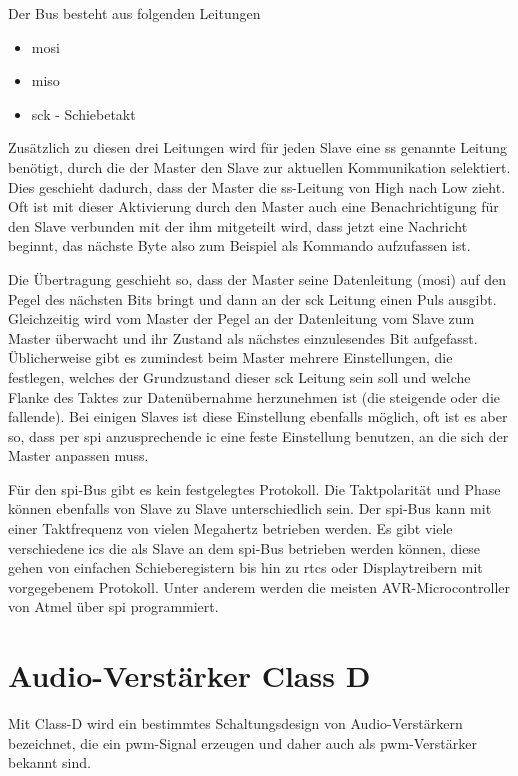 Der Bus besteht aus folgenden Leitungen
\begin{itemize}
	\item \ac{mosi}
	\item \ac{miso}
	\item \ac{sck} - Schiebetakt	
\end{itemize}
\cite{mikrocontroller-spi}

Zusätzlich zu diesen drei Leitungen wird für jeden Slave eine \ac{ss} genannte Leitung benötigt, durch die der Master den Slave zur aktuellen Kommunikation selektiert. Dies geschieht dadurch, dass der Master die \ac{ss}-Leitung von High nach Low zieht. Oft ist mit dieser Aktivierung durch den Master auch eine Benachrichtigung für den Slave verbunden mit der ihm mitgeteilt wird, dass jetzt eine Nachricht beginnt, das nächste Byte also zum Beispiel als Kommando aufzufassen ist. \cite{mikrocontroller-spi}\par

Die Übertragung geschieht so, dass der Master seine Datenleitung (\ac{mosi}) auf den Pegel des nächsten Bits bringt und dann an der \ac{sck} Leitung einen Puls ausgibt. Gleichzeitig wird vom Master der Pegel an der Datenleitung vom Slave zum Master überwacht und ihr Zustand als nächstes einzulesendes Bit aufgefasst. Üblicherweise gibt es zumindest beim Master mehrere Einstellungen, die festlegen, welches der Grundzustand dieser \ac{sck} Leitung sein soll und welche Flanke des Taktes zur Datenübernahme herzunehmen ist (die steigende oder die fallende). Bei einigen Slaves ist diese Einstellung ebenfalls möglich, oft ist es aber so, dass per \ac{spi} anzusprechende \ac{ic} eine feste Einstellung benutzen, an die sich der Master anpassen muss. \cite{mikrocontroller-spi}\par

Für den \ac{spi}-Bus gibt es kein festgelegtes Protokoll. Die Taktpolarität und Phase können ebenfalls von Slave zu Slave unterschiedlich sein. Der \ac{spi}-Bus kann mit einer Taktfrequenz von vielen Megahertz betrieben werden. Es gibt viele verschiedene \acp{ic} die als Slave an dem \ac{spi}-Bus betrieben werden können, diese gehen von einfachen Schieberegistern bis hin zu \acp{rtc} oder Displaytreibern mit vorgegebenem Protokoll. Unter anderem werden die meisten AVR-Microcontroller von Atmel über \ac{spi} programmiert. \cite{mikrocontroller-spi}\par

\section{Audio-Verstärker Class D}
Mit Class-D wird ein bestimmtes Schaltungsdesign von Audio-Verstärkern bezeichnet, die ein \ac{pwm}-Signal erzeugen und daher auch als \ac{pwm}-Verstärker bekannt sind. \cite{fairaudio-classd}\par

